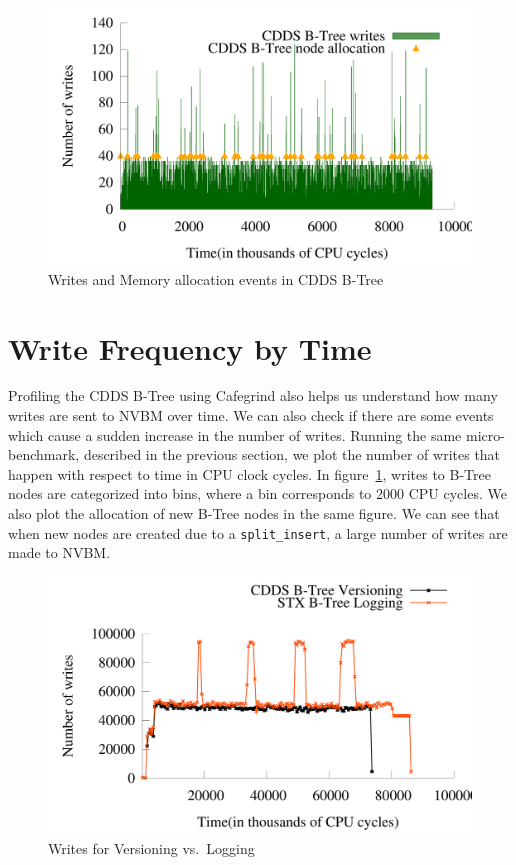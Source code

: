 \begin{figure}[t]
\begin{center}
\includegraphics[width=0.7\columnwidth]{figs/write-malloc}
\caption{Writes and Memory allocation events in CDDS B-Tree}
\label{fig:write-time-cdds}
\end{center}
\end{figure}

\section{Write Frequency by Time}
Profiling the CDDS B-Tree using Cafegrind also helps us understand how many
writes are sent to NVBM over time. We can also check if there are some events
which cause a sudden increase in the number of writes. Running the same
micro-benchmark, described in the previous section, we plot the number of
writes that happen with respect to time in CPU clock cycles. In
figure~\ref{fig:write-time-cdds}, writes to B-Tree nodes are categorized into
bins, where a bin corresponds to 2000 CPU cycles. We also plot the allocation
of new B-Tree nodes in the same figure. We can see that when new nodes are
created due to a \texttt{split\_insert}, a large number of writes are made to
NVBM.

\begin{figure}[t]
\begin{center}
\includegraphics[width=0.7\columnwidth]{figs/write-freq}
\caption{Writes for Versioning vs.\ Logging}
\label{fig:write-freq}
\end{center}
\end{figure}

